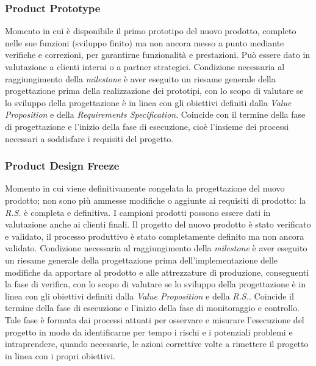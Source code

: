 \subsubsection{Product Prototype}
Momento in cui è disponibile il primo prototipo del nuovo prodotto, completo nelle sue funzioni (sviluppo finito) ma non ancora messo a punto mediante verifiche e correzioni, per garantirne funzionalità e prestazioni. Può essere dato in valutazione a clienti interni o a partner strategici. Condizione necessaria al raggiungimento della \emph{milestone} è aver eseguito un riesame generale della progettazione prima della realizzazione dei prototipi, con lo scopo di valutare se lo sviluppo della progettazione è in linea con gli obiettivi definiti dalla \emph{Value Proposition} e della \emph{Requirements Specification}. Coincide con il termine della fase di progettazione e l’inizio della fase di esecuzione, cioè l’insieme dei processi necessari a soddisfare i requisiti del progetto.\\

\subsubsection{Product Design Freeze}
Momento in cui viene definitivamente congelata la progettazione
del nuovo prodotto; non sono più ammesse modifiche o aggiunte ai requisiti
di prodotto: la \emph{R.S.} è completa e definitiva. I campioni prodotti possono essere
dati in valutazione anche ai clienti finali. Il progetto del nuovo prodotto è stato
verificato e validato, il processo produttivo è stato completamente definito ma non
ancora validato. Condizione necessaria al raggiungimento della \emph{milestone} è aver
eseguito un riesame generale della progettazione prima dell’implementazione delle
modifiche da apportare al prodotto e alle attrezzature di produzione, conseguenti
la fase di verifica, con lo scopo di valutare se lo sviluppo della progettazione è in
linea con gli obiettivi definiti dalla \emph{Value Proposition} e della \emph{R.S.}. Coincide il
termine della fase di esecuzione e l’inizio della fase di monitoraggio e controllo.
Tale fase è formata dai processi attuati per osservare e misurare l’esecuzione del
progetto in modo da identificarne per tempo i rischi e i potenziali problemi e intraprendere,
quando necessarie, le azioni correttive volte a rimettere il progetto
in linea con i propri obiettivi.\\

